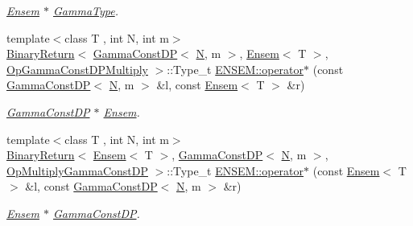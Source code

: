 \begin{DoxyCompactItemize}
\begin{DoxyCompactList}\small\item\em \mbox{\hyperlink{classENSEM_1_1Ensem}{Ensem}} $\ast$ \mbox{\hyperlink{classENSEM_1_1GammaType}{Gamma\+Type}}. \end{DoxyCompactList}\item 
{\footnotesize template$<$class T , int N, int m$>$ }\\\mbox{\hyperlink{structENSEM_1_1BinaryReturn}{Binary\+Return}}$<$ \mbox{\hyperlink{classENSEM_1_1GammaConstDP}{Gamma\+Const\+DP}}$<$ \mbox{\hyperlink{operator__name__util_8cc_a7722c8ecbb62d99aee7ce68b1752f337}{N}}, m $>$, \mbox{\hyperlink{classENSEM_1_1Ensem}{Ensem}}$<$ T $>$, \mbox{\hyperlink{structENSEM_1_1OpGammaConstDPMultiply}{Op\+Gamma\+Const\+D\+P\+Multiply}} $>$\+::Type\+\_\+t \mbox{\hyperlink{group__eensem_ga60f93a7eee86e9559faa6e162cf9b9a1}{E\+N\+S\+E\+M\+::operator$\ast$}} (const \mbox{\hyperlink{classENSEM_1_1GammaConstDP}{Gamma\+Const\+DP}}$<$ \mbox{\hyperlink{operator__name__util_8cc_a7722c8ecbb62d99aee7ce68b1752f337}{N}}, m $>$ \&l, const \mbox{\hyperlink{classENSEM_1_1Ensem}{Ensem}}$<$ T $>$ \&r)
\begin{DoxyCompactList}\small\item\em \mbox{\hyperlink{classENSEM_1_1GammaConstDP}{Gamma\+Const\+DP}} $\ast$ \mbox{\hyperlink{classENSEM_1_1Ensem}{Ensem}}. \end{DoxyCompactList}\item 
{\footnotesize template$<$class T , int N, int m$>$ }\\\mbox{\hyperlink{structENSEM_1_1BinaryReturn}{Binary\+Return}}$<$ \mbox{\hyperlink{classENSEM_1_1Ensem}{Ensem}}$<$ T $>$, \mbox{\hyperlink{classENSEM_1_1GammaConstDP}{Gamma\+Const\+DP}}$<$ \mbox{\hyperlink{operator__name__util_8cc_a7722c8ecbb62d99aee7ce68b1752f337}{N}}, m $>$, \mbox{\hyperlink{structENSEM_1_1OpMultiplyGammaConstDP}{Op\+Multiply\+Gamma\+Const\+DP}} $>$\+::Type\+\_\+t \mbox{\hyperlink{group__eensem_ga0377e46872c4fb569a240b0b60ef577e}{E\+N\+S\+E\+M\+::operator$\ast$}} (const \mbox{\hyperlink{classENSEM_1_1Ensem}{Ensem}}$<$ T $>$ \&l, const \mbox{\hyperlink{classENSEM_1_1GammaConstDP}{Gamma\+Const\+DP}}$<$ \mbox{\hyperlink{operator__name__util_8cc_a7722c8ecbb62d99aee7ce68b1752f337}{N}}, m $>$ \&r)
\begin{DoxyCompactList}\small\item\em \mbox{\hyperlink{classENSEM_1_1Ensem}{Ensem}} $\ast$ \mbox{\hyperlink{classENSEM_1_1GammaConstDP}{Gamma\+Const\+DP}}. \end{DoxyCompactList}\item 

\end{DoxyCompactItemize}
